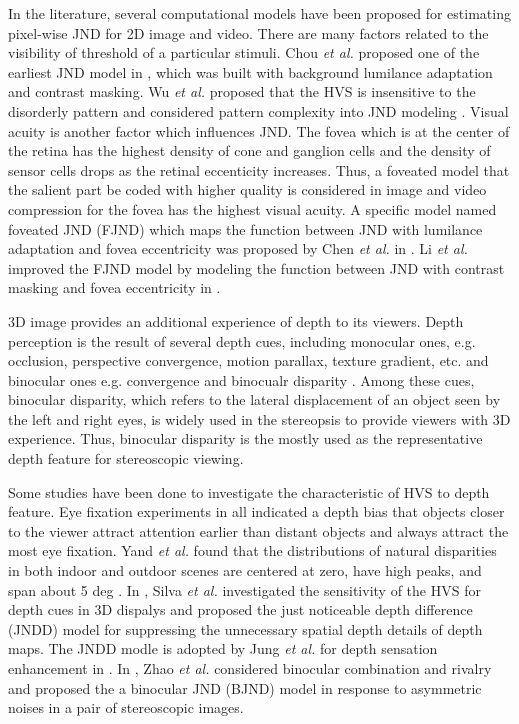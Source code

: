 \documentclass[journal]{IEEEtran}
\begin{document}
In the literature, several computational models have been proposed for estimating pixel-wise JND for 2D image and video. There are many factors related to the visibility of threshold of a particular stimuli. Chou \textit{et al.} proposed one of the earliest JND model in \cite{RN634}, which was built with background lumilance adaptation and contrast masking. Wu \textit{et al.} proposed that the HVS is insensitive to the disorderly pattern and considered pattern complexity into JND modeling \cite{RN649, RN639, Wu2017Enhanced}. Visual acuity is another factor which influences JND. The fovea which is at the center of the retina has the highest density of cone and ganglion cells and the density of sensor cells drops as the retinal eccenticity increases. Thus, a foveated model that the salient part be coded with higher quality is considered in image and video compression \cite{RN652, RN650} for the fovea has the highest visual acuity. A specific model named foveated JND (FJND) which maps the function between JND with lumilance adaptation and fovea eccentricity was proposed by Chen \textit{et al.} in \cite{RN635}. Li \textit{et al.} improved the FJND model by modeling the function between JND with contrast masking and fovea eccentricity in \cite{RN633}.

3D image provides an additional experience of depth to its viewers. Depth perception is the result of several depth cues, including monocular ones, e.g. occlusion, perspective convergence, motion parallax, texture gradient, etc. and binocular ones e.g. convergence and binocualr disparity \cite{RN631}. Among these cues, binocular disparity, which refers to the lateral displacement of an object seen by the left and right eyes, is widely used in the stereopsis to provide viewers with 3D experience. Thus, binocular disparity is the mostly used as the representative depth feature for stereoscopic viewing. 

Some studies have been done to investigate the characteristic of HVS to depth feature. Eye fixation experiments in \cite{RN150,RN138,RN148} all indicated a depth bias that objects closer to the viewer attract attention earlier than distant objects and always attract the most eye fixation. Yand \textit{et al.} found that the distributions of natural disparities in both indoor and outdoor scenes are centered at zero, have high peaks, and span about 5 deg \cite{RN607}. In \cite{RN641, RN644}, Silva \textit{et al.} investigated the sensitivity of the HVS for depth cues in 3D dispalys and proposed the just noticeable depth difference (JNDD) model for suppressing the unnecessary spatial depth details of depth maps. The JNDD modle is adopted by Jung \textit{et al.} for depth sensation enhancement in \cite{RN643,RN640}. In \cite{RN637}, Zhao \textit{et al.} considered binocular combination and rivalry and proposed the a binocular JND (BJND) model in response to asymmetric noises in a pair of stereoscopic images.
\end{document}
